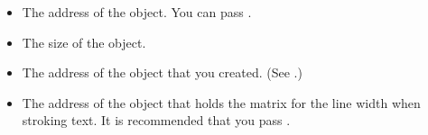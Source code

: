 \documentclass[letterpaper,12pt,english,openany,oneside]{sphinxmanual}
\begin{document}
\begin{enumerate}
\begin{itemize}
\item {} 
The address of the  object. You can pass .

\item {} 
The size of the  object.

\item {} 
The address of the  object that you created. (See .)

\item {} 
The address of the  object that holds the matrix for the line width when stroking text. It is recommended that you pass .

\end{itemize}

\end{enumerate}
\end{document}
